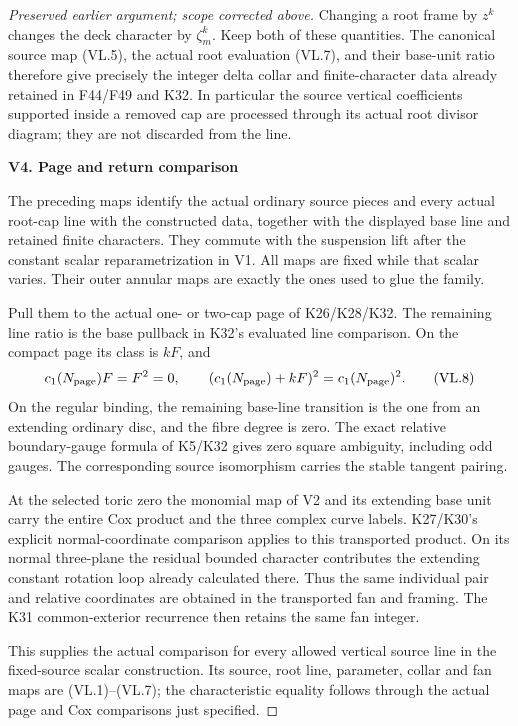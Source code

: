 \begin{proof}[Preserved earlier argument; scope corrected above]
Changing a root frame by \(z^k\) changes the deck
character by \(\zeta_m^k\). Keep both of these
quantities. The canonical source map (VL.5), the
actual root evaluation (VL.7), and their base-unit
ratio therefore give precisely the integer delta
collar and finite-character data already retained
in F44/F49 and K32. In particular the source
vertical coefficients supported inside a removed
cap are processed through its actual root divisor
diagram; they are not discarded from the line.

\par

\medskip\noindent\textbf{V4. Page and return comparison}

\par\nobreak

The preceding maps identify the actual ordinary
source pieces and every actual root-cap line with
the constructed data, together with the displayed
base line and retained finite characters. They
commute with the suspension lift after the constant
scalar reparametrization in V1. All maps are fixed
while that scalar varies. Their outer annular
maps are exactly the ones used to glue the family.

Pull them to the actual one- or two-cap page of
K26/K28/K32. The remaining line ratio is the base
pullback in K32's evaluated line comparison. On
the compact page its class is \(kF\), and
\[
 c_1(N_{\rm page})F=F^2=0,\qquad
 (c_1(N_{\rm page})+kF)^2=c_1(N_{\rm page})^2 .
 \tag{VL.8}
\]
On the regular binding, the remaining base-line
transition is the one from an extending ordinary
disc, and the fibre degree is zero. The exact
relative boundary-gauge formula of K5/K32 gives
zero square ambiguity, including odd gauges.
The corresponding source isomorphism carries
the stable tangent pairing.

At the selected toric zero the monomial map of V2
and its extending base unit carry the entire Cox
product and the three complex curve labels. K27/K30's
explicit normal-coordinate comparison applies to
this transported product. On its normal three-plane
the residual bounded character contributes the
extending constant rotation loop already calculated
there. Thus the same individual pair and relative
coordinates are obtained in the transported fan
and framing. The K31 common-exterior recurrence
then retains the same fan integer.

This supplies the actual comparison for every
allowed vertical source line in the fixed-source
scalar construction. Its source, root line,
parameter, collar and fan maps are (VL.1)--(VL.7);
the characteristic equality follows through the
actual page and Cox comparisons just specified.
\end{proof}
